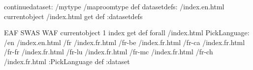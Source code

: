 \begin{ingrid}
continuedataset:
/mytype /maproomtype def
datasetdefs:
/index.en.html currentobject /index.html get def
:datasetdefs

{ EAF  SWAS  WAF } { currentobject 1 index get def } forall
/index.html {
PickLanguage:
/en /index.en.html
/fr /index.fr.html
/fr-be /index.fr.html
/fr-ca /index.fr.html
/fr-fr /index.fr.html
/fr-lu /index.fr.html
/fr-mc /index.fr.html
/fr-ch /index.fr.html
:PickLanguage
} def
:dataset
\end{ingrid}

